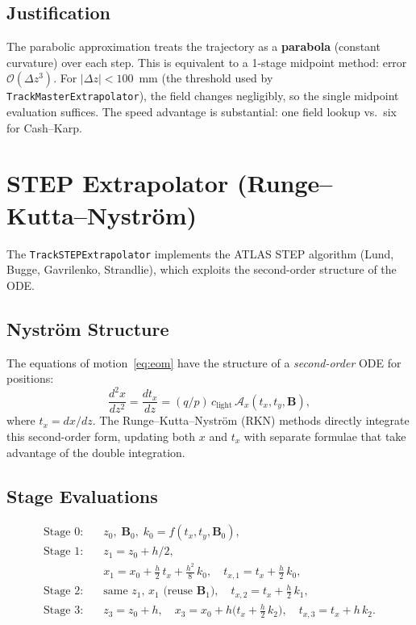 \documentclass[11pt,a4paper]{article}
\newcommand{\dz}{\Delta z}
\newcommand{\qop}{q/p}
\newcommand{\bvec}[1]{\mathbf{#1}}
\newcommand{\clgt}{c_\text{light}}
\begin{document}
\subsection{Justification}

The parabolic approximation treats the trajectory as a \textbf{parabola}
(constant curvature) over each step. This is equivalent to a 1-stage
midpoint method: error $\mathcal{O}(\dz^3)$. For $|\dz| < 100$~mm
(the threshold used by \texttt{TrackMasterExtrapolator}), the field changes
negligibly, so the single midpoint evaluation suffices.  The speed advantage
is substantial: one field lookup vs.\ six for Cash--Karp.


\section{STEP Extrapolator (Runge--Kutta--Nystr\"om)}\label{sec:step}

The \texttt{TrackSTEPExtrapolator} implements the ATLAS STEP algorithm
(Lund, Bugge, Gavrilenko, Strandlie), which exploits the second-order
structure of the ODE.

\subsection{Nystr\"om Structure}

The equations of motion~\eqref{eq:eom} have the structure of a
\emph{second-order} ODE for positions:
\[
  \frac{d^2 x}{dz^2} = \frac{dt_x}{dz} = (\qop)\,\clgt\,\mathcal{A}_x(t_x, t_y, \bvec{B}),
\]
where $t_x = dx/dz$. The Runge--Kutta--Nystr\"om (RKN) methods directly
integrate this second-order form, updating both $x$ and $t_x$ with separate
formulae that take advantage of the double integration.

\subsection{Stage Evaluations}

\begin{align}
  \text{Stage 0:}\quad & z_0,\; \bvec{B}_0,\; k_0 = f(t_x, t_y, \bvec{B}_0), \\[4pt]
  \text{Stage 1:}\quad & z_1 = z_0 + h/2, \\
    & x_1 = x_0 + \tfrac{h}{2}\,t_x + \tfrac{h^2}{8}\,k_0, \quad
      t_{x,1} = t_x + \tfrac{h}{2}\,k_0, \\[4pt]
  \text{Stage 2:}\quad & \text{same } z_1,\,x_1\text{ (reuse } \bvec{B}_1\text{)}, \quad
      t_{x,2} = t_x + \tfrac{h}{2}\,k_1, \\[4pt]
  \text{Stage 3:}\quad & z_3 = z_0 + h, \quad
      x_3 = x_0 + h\bigl(t_x + \tfrac{h}{2}\,k_2\bigr), \quad
      t_{x,3} = t_x + h\,k_2.
\end{align}
\end{document}

